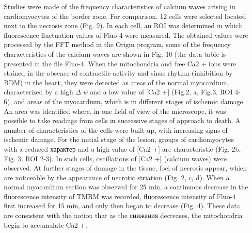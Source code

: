 \documentclass[a4paper,12pt]{article}
\begin{document}
Studies were made of the frequency characteristics of calcium waves arising in cardiomyocytes of the border zone. For comparison, 12 cells were selected located next to the necrosis zone (Fig. 9). In each cell, an ROI was determined in which fluorescence fluctuation values of Fluo-4 were measured. The obtained values were processed by the FFT method in the Origin program, some of the frequency characteristics of the calcium waves are shown in Fig. 10 (the data table is presented in the file Fluo-4.
When the mitochondria and free Ca2 + ions were stained in the absence of contractile activity and sinus rhythm (inhibition by BDM) in the heart, they were detected as areas of the normal myocardium, characterized by a high $\Delta$ $\psi$ and a low value of [Ca2 +] (Fig.2, a, Fig.3, ROI 4-6), and areas of the myocardium, which is in different stages of ischemic damage.
An area was identified where, in one field of view of the microscope, it was possible to take readings from cells in successive stages of approach to death. A number of characteristics of the cells were built up, with increasing signs of ischemic damage.
For the initial stage of the lesion, groups of cardiomyocytes with a reduced  характер and a high value of [Ca2 +] are characteristic (Fig. 2b, Fig. 3, ROI 2-3). In such cells, oscillations of [Ca2 +] (calcium waves) were observed. At further stages of damage in the tissue, foci of necrosis appear, which are noticeable by the appearance of necrotic striation (Fig. 2, c, d). When a normal myocardium section was observed for 25 min, a continuous decrease in the fluorescence intensity of TMRM was recorded, fluorescence intensity of Fluo-4 first increased for 15 min, and only then began to decrease (Fig. 4). These data are consistent with the notion that as the снижения decreases, the mitochondria begin to accumulate Ca2 +.


\end{document}
